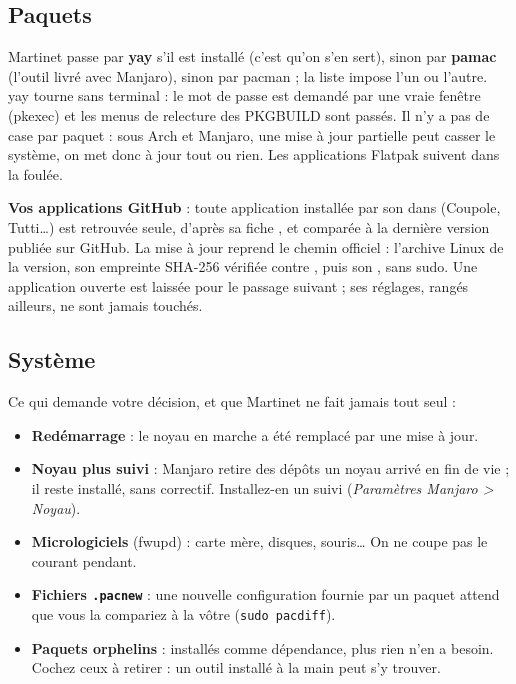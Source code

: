 \subsection{Paquets}


Martinet passe par \textbf{yay} s'il est installé (c'est qu'on s'en sert), sinon par \textbf{pamac}
(l'outil livré avec Manjaro), sinon par pacman ; la liste  impose l'un ou l'autre.
yay tourne sans terminal : le mot de passe est demandé par une vraie fenêtre (pkexec) et les menus de
relecture des PKGBUILD sont passés. Il n'y a pas de case par paquet : sous Arch et Manjaro, une mise à
jour partielle peut casser le système, on met donc à jour tout ou rien. Les applications Flatpak
suivent dans la foulée.

\textbf{Vos applications GitHub} : toute application installée par son  dans
 (Coupole, Tutti…) est retrouvée seule, d'après sa fiche
, et comparée à la dernière version publiée sur GitHub. La mise à jour reprend
le chemin officiel : l'archive Linux de la version, son empreinte SHA-256 vérifiée contre
, puis son , sans sudo. Une application ouverte est laissée
pour le passage suivant ; ses réglages, rangés ailleurs, ne sont jamais touchés.

\subsection{Système}


Ce qui demande votre décision, et que Martinet ne fait jamais tout seul :
\begin{itemize}
\item \textbf{Redémarrage} : le noyau en marche a été remplacé par une mise à jour.
\item \textbf{Noyau plus suivi} : Manjaro retire des dépôts un noyau arrivé en fin de vie ; il reste
installé, sans correctif. Installez-en un suivi (\textit{Paramètres Manjaro > Noyau}).
\item \textbf{Micrologiciels} (fwupd) : carte mère, disques, souris… On ne coupe pas le courant pendant.
\item \textbf{Fichiers \texttt{.pacnew}} : une nouvelle configuration fournie par un paquet attend que
vous la compariez à la vôtre (\texttt{sudo pacdiff}).
\item \textbf{Paquets orphelins} : installés comme dépendance, plus rien n'en a besoin. Cochez ceux à
retirer : un outil installé à la main peut s'y trouver.
\end{itemize}

